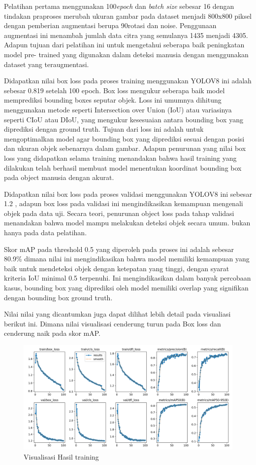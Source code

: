 Pelatihan pertama menggunakan 100\emph{epoch} dan \emph{batch size} sebesar 16 dengan tindakan praproses merubah ukuran gambar pada dataset menjadi 800x800 piksel dengan pemberian augmentasi berupa 90\textdegree rotasi dan noise. Penggunaan augmentasi ini menambah jumlah data citra yang semulanya 1435 menjadi 4305. Adapun tujuan dari pelatihan ini untuk mengetahui seberapa baik peningkatan model pre- trained yang digunakan dalam deteksi manusia dengan menggunakan dataset yang teraugmentasi.

Didapatkan nilai box loss pada proses training menggunakan YOLOV8 ini adalah sebesar 0.819 setelah 100 epoch. Box loss mengukur seberapa baik model memprediksi bounding boxes seputar objek. Loss ini umumnya dihitung menggunakan metode seperti Intersection over Union (IoU) atau variasinya seperti CIoU atau DIoU, yang mengukur kesesuaian antara bounding box yang diprediksi dengan ground truth. Tujuan dari loss ini adalah untuk mengoptimalkan model agar bounding box yang diprediksi sesuai dengan posisi dan ukuran objek sebenarnya dalam gambar. Adapun penurunan yang nilai box loss yang didapatkan selama training menandakan bahwa hasil training yang dilakukan telah berhasil membuat model menentukan koordinat bounding box pada object manusia dengan akurat.

Didapatkan nilai box loss pada proses validasi menggunakan YOLOV8 ini sebesar 1.2 , adapun box loss pada validasi ini mengindikasikan kemampuan mengenali objek pada data uji. Secara teori, penurunan object loss pada tahap validasi menandakan bahwa model mampu melakukan deteksi objek secara umum. bukan hanya pada data pelatihan.

Skor mAP pada threshold 0.5 yang diperoleh pada proses ini adalah sebesar 80.9\% dimana nilai ini mengindikasikan bahwa model memiliki kemampuan yang baik untuk mendeteksi objek dengan ketepatan yang tinggi, dengan syarat kriteria IoU minimal 0.5 terpenuhi. Ini mengindikasikan dalam banyak percobaan kasus, bounding box yang diprediksi oleh model memiliki overlap yang signifikan dengan bounding box ground truth.

Nilai nilai yang dicantumkan juga dapat dilihat lebih detail pada visualiasi berikut ini. Dimana nilai visualisasi cenderung turun pada Box loss dan cenderung naik pada skor mAP. 

\begin{figure}[H]
    \centering
    \includegraphics[scale=0.4]{gambar/loss 100 epoch.png}
    \caption{Visualisasi Hasil training}
    \label{fig:visualisasi hasil training}
\end{figure}

